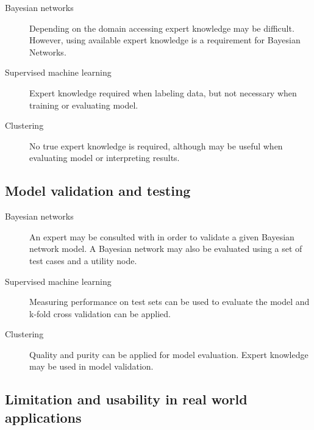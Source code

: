 \documentclass[12pt,notitlepage]{article}
\begin{document}
\begin{description}

    \item[Bayesian networks] Depending on the domain accessing expert knowledge
        may be difficult. However, using available expert knowledge is a
        requirement for Bayesian Networks.

    \item[Supervised machine learning] Expert knowledge required when labeling
        data, but not necessary when training or evaluating model.

    \item[Clustering] No true expert knowledge is required, although may be
        useful when evaluating model or interpreting results.

\end{description}


\subsection*{Model validation and testing}

\begin{description}

    \item[Bayesian networks] An expert may be consulted with in order to
        validate a given Bayesian network model. A Bayesian network may also be
        evaluated using a set of test cases and a utility node.

    \item[Supervised machine learning] Measuring performance on test sets can be
        used to evaluate the model and k-fold cross validation can be applied.

    \item[Clustering] Quality and purity can be applied for model evaluation.
        Expert knowledge may be used in model validation.

\end{description}


\subsection*{Limitation and usability in real world applications}
\end{document}
